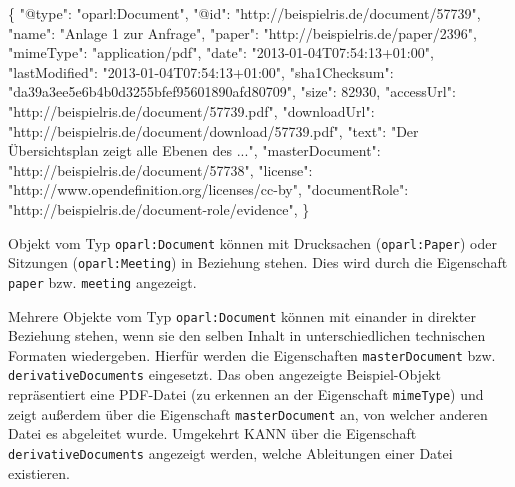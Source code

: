 \documentclass[,a4paper]{article}
\newenvironment{Shaded}{}{}
\newcommand{\DataTypeTok}[1]{\textcolor[rgb]{0.56,0.13,0.00}{{#1}}}
\newcommand{\DecValTok}[1]{\textcolor[rgb]{0.25,0.63,0.44}{{#1}}}
\newcommand{\StringTok}[1]{\textcolor[rgb]{0.25,0.44,0.63}{{#1}}}
\newcommand{\NormalTok}[1]{{#1}}
\begin{document}
\begin{Shaded}
\begin{Highlighting}[]
\NormalTok{\{}
    \DataTypeTok{"@type"}\NormalTok{: }\StringTok{"oparl:Document"}\NormalTok{,}
    \DataTypeTok{"@id"}\NormalTok{: }\StringTok{"http://beispielris.de/document/57739"}\NormalTok{,}
    \DataTypeTok{"name"}\NormalTok{: }\StringTok{"Anlage 1 zur Anfrage"}\NormalTok{,}
    \DataTypeTok{"paper"}\NormalTok{: }\StringTok{"http://beispielris.de/paper/2396"}\NormalTok{,}
    \DataTypeTok{"mimeType"}\NormalTok{: }\StringTok{"application/pdf"}\NormalTok{,}
    \DataTypeTok{"date"}\NormalTok{: }\StringTok{"2013-01-04T07:54:13+01:00"}\NormalTok{,}
    \DataTypeTok{"lastModified"}\NormalTok{: }\StringTok{"2013-01-04T07:54:13+01:00"}\NormalTok{,}
    \DataTypeTok{"sha1Checksum"}\NormalTok{: }\StringTok{"da39a3ee5e6b4b0d3255bfef95601890afd80709"}\NormalTok{,}
    \DataTypeTok{"size"}\NormalTok{: }\DecValTok{82930}\NormalTok{,}
    \DataTypeTok{"accessUrl"}\NormalTok{: }\StringTok{"http://beispielris.de/document/57739.pdf"}\NormalTok{,}
    \DataTypeTok{"downloadUrl"}\NormalTok{: }\StringTok{"http://beispielris.de/document/download/57739.pdf"}\NormalTok{,}
    \DataTypeTok{"text"}\NormalTok{: }\StringTok{"Der Übersichtsplan zeigt alle Ebenen des ..."}\NormalTok{,}
    \DataTypeTok{"masterDocument"}\NormalTok{: }\StringTok{"http://beispielris.de/document/57738"}\NormalTok{,}
    \DataTypeTok{"license"}\NormalTok{: }\StringTok{"http://www.opendefinition.org/licenses/cc-by"}\NormalTok{,}
    \DataTypeTok{"documentRole"}\NormalTok{: }\StringTok{"http://beispielris.de/document-role/evidence"}\NormalTok{,}
\NormalTok{\}}
\end{Highlighting}
\end{Shaded}

Objekt vom Typ \texttt{oparl:Document} können mit Drucksachen
(\texttt{oparl:Paper}) oder Sitzungen (\texttt{oparl:Meeting}) in
Beziehung stehen. Dies wird durch die Eigenschaft \texttt{paper} bzw.
\texttt{meeting} angezeigt.

Mehrere Objekte vom Typ \texttt{oparl:Document} können mit einander in
direkter Beziehung stehen, wenn sie den selben Inhalt in
unterschiedlichen technischen Formaten wiedergeben. Hierfür werden die
Eigenschaften \texttt{masterDocument} bzw. \texttt{derivativeDocuments}
eingesetzt. Das oben angezeigte Beispiel-Objekt repräsentiert eine
PDF-Datei (zu erkennen an der Eigenschaft \texttt{mimeType}) und zeigt
außerdem über die Eigenschaft \texttt{masterDocument} an, von welcher
anderen Datei es abgeleitet wurde. Umgekehrt KANN über die Eigenschaft
\texttt{derivativeDocuments} angezeigt werden, welche Ableitungen einer
Datei existieren.
\end{document}
